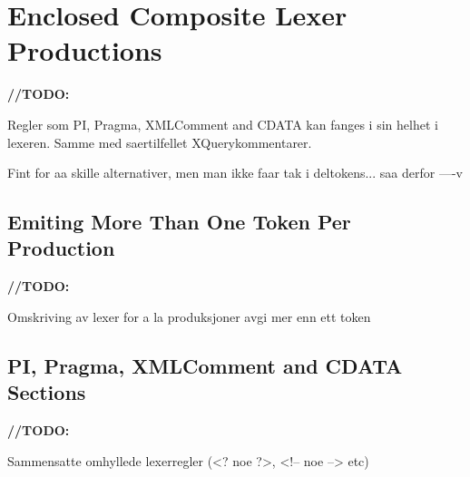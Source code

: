 \section{Enclosed Composite Lexer Productions}
\label{sect:rewriteGrammar:enclosedComposite}
\textbf{\LARGE //TODO:} 

Regler som PI, Pragma, XMLComment and CDATA kan fanges i sin helhet i lexeren. Samme med saertilfellet XQuerykommentarer. 

Fint for aa skille alternativer, men man ikke faar tak i deltokens... saa derfor ----v

\subsection{Emiting More Than One Token Per Production}
\textbf{\LARGE //TODO:} 

Omskriving av lexer for a la produksjoner avgi mer enn ett token

\subsection{PI, Pragma, XMLComment and CDATA Sections}
\textbf{\LARGE //TODO:} 

Sammensatte omhyllede lexerregler (<? noe ?>, <!-- noe --> etc)

